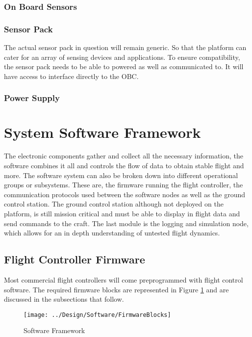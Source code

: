 			\subsubsection{On Board Sensors}
			
			\subsubsection{Sensor Pack}
			The actual sensor pack in question will remain generic. So that the platform can cater for an array of sensing devices and applications. To ensure compatibility, the sensor pack needs to be able to powered as well as communicated to. It will have access to interface directly to the OBC.
	
			\subsubsection{Power Supply}

				
	\section{System Software Framework}
	The electronic components gather and collect all the necessary information, the software combines it all and controls the flow of data to obtain stable flight and more. The software system can also be broken down into different operational groups or subsystems. These are, the firmware running the flight controller, the communication protocols used between the software nodes as well as the ground control station. The ground control station although not deployed on the platform, is still mission critical and must be able to display in flight data and send commands to the craft. The last module is the logging and simulation node, which allows for an in depth understanding of untested flight dynamics.
	
		\subsection{Flight Controller Firmware}
		Most commercial flight controllers will come preprogrammed with flight control software. The required firmware blocks are represented in Figure \ref{IM_SoftwareArchitecture} and are discussed in the subsections that follow.
		
		\begin{figure}[H]
			\centering
			\texttt{[image: ../Design/Software/FirmwareBlocks]}
			\caption{Software Framework}
			\label{IM_SoftwareArchitecture}
		\end{figure}
		
